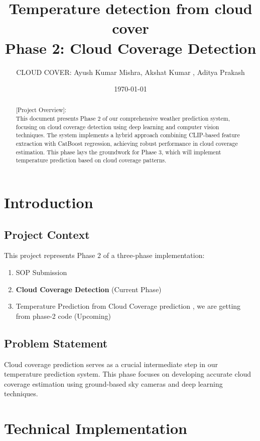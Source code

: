 \documentclass[11pt,a4paper]{article}
\title{
    \textcolor{primaryblue}{\textbf{\LARGE Temperature detection from cloud cover}}\\
    \vspace{0.5cm}
    \Large Phase 2: Cloud Coverage Detection
}
\author{CLOUD COVER: Ayush Kumar Mishra, Akshat Kumar , Aditya Prakash}
\date{\today}
\begin{document}
\maketitle

\begin{abstract}
[Project Overview]:\\

This document presents Phase 2 of our comprehensive weather prediction system, focusing on cloud coverage detection using deep learning and computer vision techniques. The system implements a hybrid approach combining CLIP-based feature extraction with CatBoost regression, achieving robust performance in cloud coverage estimation. This phase lays the groundwork for Phase 3, which will implement temperature prediction based on cloud coverage patterns.

\end{abstract}

\tableofcontents
\newpage

\section{Introduction}
\subsection{Project Context}
This project represents Phase 2 of a three-phase implementation:
\begin{enumerate}[label=\textcolor{primaryblue}{Phase \arabic*:}]
    \item SOP Submission
    \item \textbf{Cloud Coverage Detection} (Current Phase)
    \item Temperature Prediction from Cloud Coverage prediction , we are getting from phase-2 code (Upcoming)
\end{enumerate}

\subsection{Problem Statement}
Cloud coverage prediction serves as a crucial intermediate step in our temperature prediction system. This phase focuses on developing accurate cloud coverage estimation using ground-based sky cameras and deep learning techniques.


\section{Technical Implementation}
\end{document}
